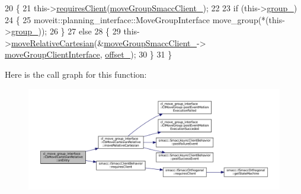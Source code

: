 \begin{DoxyCode}
20 \{
21   this->\hyperlink{classsmacc_1_1ISmaccClientBehavior_a32b16e99e3b4cb289414203dc861a440}{requiresClient}(\hyperlink{classcl__move__group__interface_1_1CbMoveCartesianRelative_ac0226b2db9bf4de86eb64a535457e295}{moveGroupSmaccClient\_});
22 
23   \textcolor{keywordflow}{if} (this->\hyperlink{classcl__move__group__interface_1_1CbMoveCartesianRelative_a194d8357267ccd5ee0a10200f1c4cae0}{group\_})
24   \{
25       moveit::planning\_interface::MoveGroupInterface move\_group(*(this->\hyperlink{classcl__move__group__interface_1_1CbMoveCartesianRelative_a194d8357267ccd5ee0a10200f1c4cae0}{group\_}));
26   \}
27   \textcolor{keywordflow}{else}
28   \{
29       this->\hyperlink{classcl__move__group__interface_1_1CbMoveCartesianRelative_ae8443c7f81affe5c4450e83fc665487f}{moveRelativeCartesian}(&\hyperlink{classcl__move__group__interface_1_1CbMoveCartesianRelative_ac0226b2db9bf4de86eb64a535457e295}{moveGroupSmaccClient\_}->
      \hyperlink{classcl__move__group__interface_1_1ClMoveGroup_a92922ea689e4e1b7b91512c56629c95b}{moveGroupClientInterface}, \hyperlink{classcl__move__group__interface_1_1CbMoveCartesianRelative_aac5b6c2f42406da43f94cd5334aca925}{offset\_});
30   \}
31 \}
\end{DoxyCode}
Here is the call graph for this function\+:
\nopagebreak
\begin{figure}[H]
\begin{center}
\leavevmode
\includegraphics[width=350pt]{classcl__move__group__interface_1_1CbMoveCartesianRelative_a7d65e3d5fa3f2c7b47d9cbe631f448ad_cgraph}
\end{center}
\end{figure}
\mbox{\label{classcl__move__group__interface_1_1CbMoveCartesianRelative_a4ec79f1b62ddd8ecabf1f63aabb69013}} 
